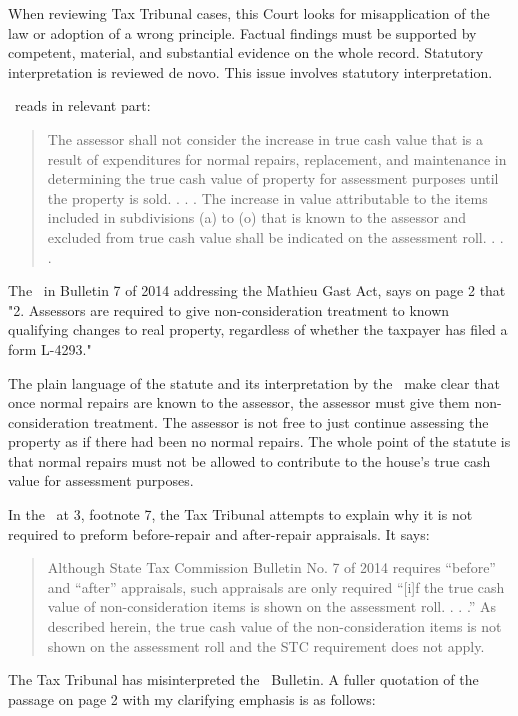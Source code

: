 \documentclass[12pt,\documentclassflag]{michiganCourtOfAppealsBrief}
\def\mathieuGast{\pincite[l]{MCL}{211.27(2)}}
\begin{document}
When reviewing Tax Tribunal cases, this Court looks for misapplication of the law or adoption of a wrong principle. Factual findings must be supported by competent, material, and substantial evidence on the whole record. Statutory interpretation is reviewed de novo.  This issue involves statutory interpretation.

\mathieuGast\ reads in relevant part:

\begin{quote}
	The assessor shall not consider the increase in true cash value that is a result of expenditures for normal repairs, replacement, and maintenance in determining the true cash value of property for assessment purposes until the property is sold. . . . The increase in value attributable to the items included in subdivisions (a) to (o) that is known to the assessor and excluded from true cash value shall be indicated on the assessment roll. . . .
\end{quote}

The \STC\ in Bulletin 7 of 2014 addressing the Mathieu Gast Act, says on page 2 that "2. Assessors are required to give non-consideration treatment to known qualifying changes to real property, regardless of whether the taxpayer has filed a form L-4293."

The plain language of the statute and its interpretation by the \STC\ make clear that once normal repairs are known to the assessor, the assessor must give them non-consideration treatment. The assessor is not free to just continue assessing the property as if there had been no normal repairs. The whole point of the statute is that normal repairs must not be allowed to contribute to the house's true cash value for assessment purposes.

In the \orderDenying\ at 3, footnote 7, the Tax Tribunal attempts to explain why it is not required to preform before-repair and after-repair appraisals. It says: 

\begin{quote}
	Although State Tax Commission Bulletin No. 7 of 2014 requires “before” and “after” appraisals, such appraisals are only required “[i]f the true cash value of non-consideration items is shown on the assessment roll. . . .” As	described herein, the true cash value of the non-consideration items is not shown on the assessment roll	and the STC requirement does not apply.
\end{quote}

The Tax Tribunal has misinterpreted the \STC\ Bulletin. A fuller quotation of the passage on page 2 with my clarifying emphasis is as follows:
\end{document}
